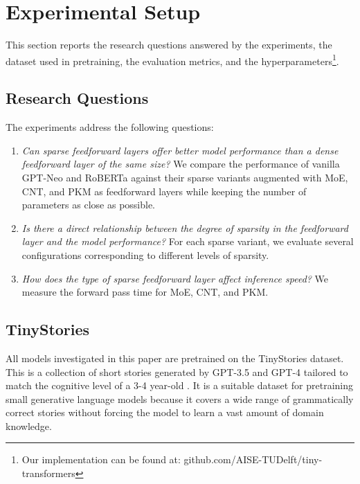 
\section{Experimental Setup}
\label{sec:setup}
This section reports the research questions answered by the experiments, the dataset used in pretraining, the evaluation metrics, and the hyperparameters\footnote{Our implementation can be found at: github.com/AISE-TUDelft/tiny-transformers}.


\subsection{Research Questions}
The experiments address the following questions:
\begin{enumerate}
    \item \textit{Can sparse feedforward layers offer better model performance than a dense feedforward layer of the same size?} We compare the performance of vanilla GPT-Neo and RoBERTa against their sparse variants augmented with MoE, CNT, and PKM as feedforward layers while keeping the number of parameters as close as possible.
    \item \textit{Is there a direct relationship between the degree of sparsity in the feedforward layer and the model performance?} For each sparse variant, we evaluate several configurations corresponding to different levels of sparsity.
    \item \textit{How does the type of sparse feedforward layer affect inference speed?} We measure the forward pass time for MoE, CNT, and PKM.
\end{enumerate}

\subsection{TinyStories}
All models investigated in this paper are pretrained on the TinyStories dataset. This is a collection of short stories generated by GPT-3.5 and GPT-4 tailored to match the cognitive level of a 3-4 year-old \cite{eldan_tinystories_2023}. It is a suitable dataset for pretraining small generative language models because it covers a wide range of grammatically correct stories without forcing the model to learn a vast amount of domain knowledge. 

